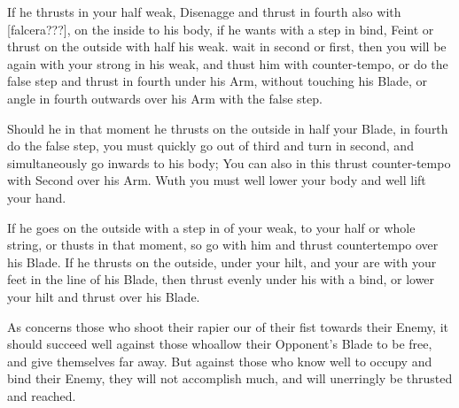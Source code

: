 If he thrusts in your half weak, Disenagge and thrust in fourth also
with [falcera???], on the inside to his body, if he wants
with a step in bind, Feint or thrust on the outside with half his
weak. wait in second or first, then you will be again with your strong
in his weak, and thust him with counter-tempo, or do the false
step
and thrust in fourth under his Arm, without touching his Blade, or
angle in fourth outwards over his Arm with the false step.


Should he in that moment he thrusts on the outside in half your Blade,
in fourth do the false step, you must quickly go out of third and
turn in second, and simultaneously go inwards to his body; You can
also in this thrust counter-tempo with Second over his Arm. Wuth you
must well lower your body and well lift your hand.


If he goes on the outside with a step in of your weak, to your half or
whole string, or thusts in that moment, so go with him and thrust
countertempo over his Blade. If he thrusts on the outside, under your
hilt, and your are with your feet in the line of his Blade, then
thrust evenly under his with a bind, or lower your hilt and thrust
over his Blade.


As concerns those who shoot their rapier our of their fist towards
their Enemy, it should succeed well against those whoallow their
Opponent's Blade to be free, and give themselves far away. But against
those who know well to occupy and bind their Enemy, they will not
accomplish much, and will unerringly be thrusted and reached.
